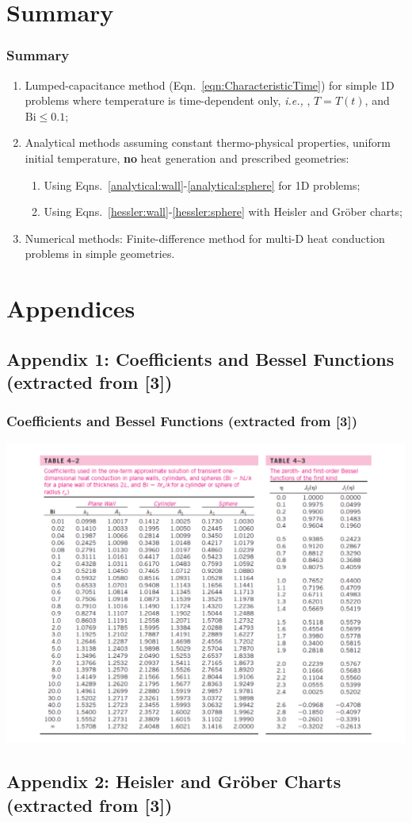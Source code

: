 \documentclass[10pt,compress,unknownkeysallowed]{beamer}
\newcommand{\ie}{{\it i.e., }}
\newcommand{\dimensionless}[1]{\mathrm{#1}}
\newcommand{\Bi}{\dimensionless{Bi}}
\begin{document}
\section{Summary} 


\begin{frame}
  \frametitle{Summary}
    \begin{enumerate}  
       \item Lumped-capacitance method (Eqn.~\ref{eqn:CharacteristicTime}) for simple 1D problems where temperature is time-dependent only, \ie , $T=T(t)$, and $\Bi \leq 0.1$;  
       \item Analytical methods assuming constant thermo-physical properties, uniform initial temperature, {\bf no} heat generation and prescribed geometries:
           \begin{enumerate}
              \item Using Eqns.~\ref{analytical:wall}-\ref{analytical:sphere} for 1D problems;
              \item Using Eqns.~\ref{hessler:wall}-\ref{hessler:sphere} with Heisler and Gr\"ober charts;
            \end{enumerate}
       \item Numerical methods: Finite-difference method for multi-D heat conduction problems in simple geometries.
    \end{enumerate}
\end{frame}


\section{Appendices}

\subsection{Appendix 1: Coefficients and Bessel Functions (extracted from [3])}\label{appendix1}
\begin{frame}
 \frametitle{Coefficients and Bessel Functions (extracted from [3])}
        \begin{center}
          \includegraphics[width=.9\columnwidth,height=.65\columnwidth,clip]{./Pics/BaselFunctionTable}
        \end{center}
\end{frame}


\subsection{Appendix 2: Heisler and Gr\"ober Charts (extracted from [3])}\label{appendix2}
{
  
}
\end{document}
